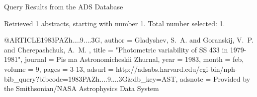Query Results from the ADS Database


Retrieved 1 abstracts, starting with number 1.  Total number selected: 1.

@ARTICLE{1983PAZh....9....3G,
   author = {{Gladyshev}, S.~A. and {Goranskij}, V.~P. and {Cherepashchuk}, A.~M.
	},
    title = "{Photometric variability of SS 433 in 1979-1981}",
  journal = {Pis ma Astronomicheskii Zhurnal},
     year = 1983,
    month = feb,
   volume = 9,
    pages = {3-13},
   adsurl = {http://adsabs.harvard.edu/cgi-bin/nph-bib_query?bibcode=1983PAZh....9....3G&db_key=AST},
  adsnote = {Provided by the Smithsonian/NASA Astrophysics Data System}
}


